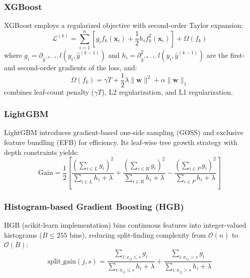 \documentclass[journal]{IEEEtran}
\begin{document}
\subsubsection{XGBoost}

XGBoost \cite{chen2016xgboost} employs a regularized objective with second-order Taylor expansion:
\begin{equation}
\mathcal{L}^{(k)} = \sum_{i=1}^{n} \left[g_i f_k(\mathbf{x}_i) + \frac{1}{2}h_i f_k^2(\mathbf{x}_i)\right] + \Omega(f_k)
\end{equation}
where $g_i = \partial_{\hat{y}^{(k-1)}} l(y_i, \hat{y}^{(k-1)})$ and $h_i = \partial^2_{\hat{y}^{(k-1)}} l(y_i, \hat{y}^{(k-1)})$ are the first- and second-order gradients of the loss, and:
\begin{equation}
\Omega(f_k) = \gamma T + \frac{1}{2}\lambda\|\mathbf{w}\|^2 + \alpha\|\mathbf{w}\|_1
\end{equation}
combines leaf-count penalty ($\gamma T$), L2 regularization, and L1 regularization.

\subsubsection{LightGBM}

LightGBM \cite{ke2017lightgbm} introduces gradient-based one-side sampling (GOSS) and exclusive feature bundling (EFB) for efficiency. Its leaf-wise tree growth strategy with depth constraints yields:
\begin{equation}
\text{Gain} = \frac{1}{2}\left[\frac{(\sum_{i \in L} g_i)^2}{\sum_{i \in L} h_i + \lambda} + \frac{(\sum_{i \in R} g_i)^2}{\sum_{i \in R} h_i + \lambda} - \frac{(\sum_{i \in P} g_i)^2}{\sum_{i \in P} h_i + \lambda}\right]
\end{equation}

\subsubsection{Histogram-based Gradient Boosting (HGB)}

HGB (scikit-learn implementation) bins continuous features into integer-valued histograms ($B \leq 255$ bins), reducing split-finding complexity from $\mathcal{O}(n)$ to $\mathcal{O}(B)$:
\begin{equation}
\text{split\_gain}(j, s) = \frac{\sum_{i: x_{ij} \leq s} g_i}{\sum_{i: x_{ij} \leq s} h_i + \lambda} + \frac{\sum_{i: x_{ij} > s} g_i}{\sum_{i: x_{ij} > s} h_i + \lambda}
\end{equation}
\end{document}
